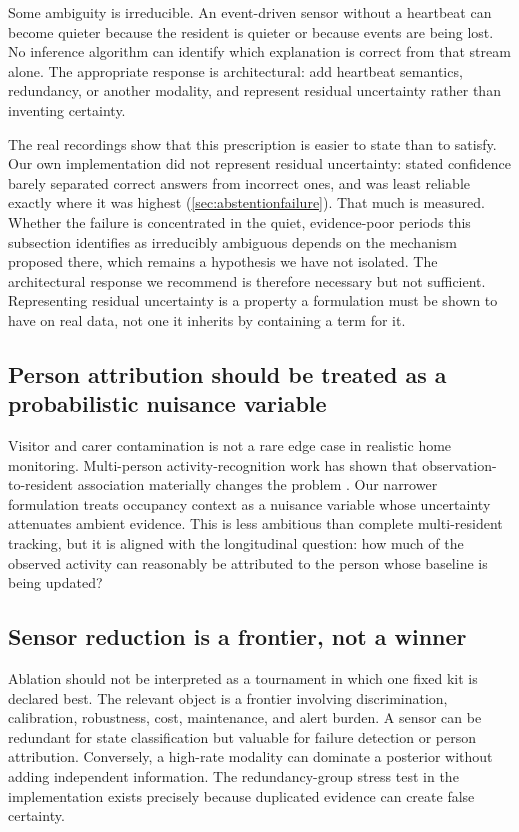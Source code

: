\documentclass[11pt]{article}
\begin{document}
Some ambiguity is irreducible. An event-driven sensor without a heartbeat can become quieter because the resident is quieter or because events are being lost. No inference algorithm can identify which explanation is correct from that stream alone. The appropriate response is architectural: add heartbeat semantics, redundancy, or another modality, and represent residual uncertainty rather than inventing certainty.

The real recordings show that this prescription is easier to state than to
satisfy. Our own implementation did not represent residual uncertainty: stated
confidence barely separated correct answers from incorrect ones, and was least
reliable exactly where it was highest (\cref{sec:abstentionfailure}). That much
is measured. Whether the failure is concentrated in the quiet, evidence-poor
periods this subsection identifies as irreducibly ambiguous depends on the
mechanism proposed there, which remains a hypothesis we have not isolated. The
architectural response we recommend is therefore necessary but not sufficient.
Representing residual uncertainty is a property a formulation must be shown to
have on real data, not one it inherits by containing a term for it.

\subsection{Person attribution should be treated as a probabilistic nuisance variable}

Visitor and carer contamination is not a rare edge case in realistic home monitoring. Multi-person activity-recognition work has shown that observation-to-resident association materially changes the problem \citep{wang2022multiperson}. Our narrower formulation treats occupancy context as a nuisance variable whose uncertainty attenuates ambient evidence. This is less ambitious than complete multi-resident tracking, but it is aligned with the longitudinal question: how much of the observed activity can reasonably be attributed to the person whose baseline is being updated?

\subsection{Sensor reduction is a frontier, not a winner}

Ablation should not be interpreted as a tournament in which one fixed kit is declared best. The relevant object is a frontier involving discrimination, calibration, robustness, cost, maintenance, and alert burden. A sensor can be redundant for state classification but valuable for failure detection or person attribution. Conversely, a high-rate modality can dominate a posterior without adding independent information. The redundancy-group stress test in the implementation exists precisely because duplicated evidence can create false certainty.
\end{document}
